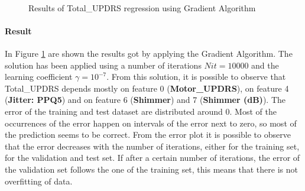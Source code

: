 \documentclass[12pt,a4paper,oneside]{article}
\begin{document}
\begin{figure}[p]
		\\
		\caption{Results of Total\_UPDRS regression using Gradient Algorithm}
		\label{fig:Figure 3}
	\end{figure}
	\pagebreak
	\paragraph{Result}
	In Figure \ref{fig:Figure 3} are shown the results got by applying the Gradient Algorithm. The solution has been applied using a number of iterations $Nit=10000$ and the learning coefficient $\gamma=10^{-7}$. From this solution, it is possible to observe that Total\_UPDRS depends mostly on feature 0 (\textbf{Motor\_UPDRS}), on feature 4 (\textbf{Jitter: PPQ5}) and on feature 6 (\textbf{Shimmer}) and 7 (\textbf{Shimmer (dB)}).
	The error of the training and test dataset are distributed around 0. Most of the occurrences of the error happen on intervals of the error next to zero, so most of the prediction seems to be correct.
	From the error plot it is possible to observe that the error decreases with the number of iterations, either for the training set, for the validation and test set. If after a certain number of iterations, the error of the validation set follows the one of the training set, this means that there is not overfitting of data.
	
\end{document}
